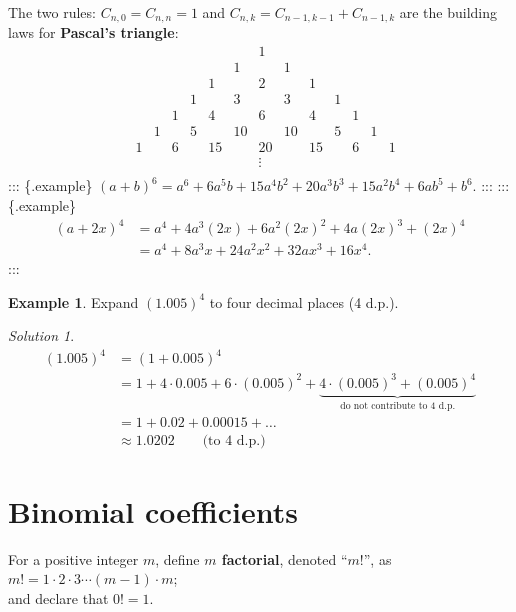 \documentclass[
  english,
  12pt,
  oneside]{book}
\theoremstyle{definition}
\theoremstyle{definition}
\newtheorem{example}{Example}[chapter]
\theoremstyle{definition}
\theoremstyle{definition}
\theoremstyle{remark}
\newtheorem*{solution}{Solution}
\begin{document}
The two rules: \(C_{n,0}=C_{n,n}=1\) and \(C_{n,k}=C_{n-1,k-1}+C_{n-1,k}\) are the building laws for \textbf{Pascal's triangle}:
\[\begin{array}{cccccccccccccc}
    &  &  &  &  &  &  &1 &  &  &  &  &  &   \\
    &  &  &  &  &  &1 &  &1 &  &  &  &  &   \\
    &  &  &  &  &1 &  &2 &  &1 &  &  &  &   \\
    &  &  &  &1 &  &3 &  &3 &  &1 &  &  &   \\
    &  &  &1 &  &4 &  &6 &  &4 &  &1 &  &   \\
    &  &1 &  &5 &  &10&  &10&  &5 &  &1 &   \\
    &1 &  &6 &  &15&  &20&  &15&  &6 &  &1  \\
    &  &  &  &  &  &  &\vdots&  &  &  &  &  &   \\
\end{array}\]
::: \{.example\}
\((a+b)^6 = a^6 + 6 a^5b + 15 a^4b^2 + 20 a^3b^3 + 15 a^2b^4 + 6 ab^5 + b^6\).
:::
::: \{.example\}
\begin{align*}(a+2x)^4 &= a^4 + 4a^3(2x) + 6a^2(2x)^2 + 4a(2x)^3+(2x)^4\\
&= a^4 +8a^3x+24a^2x^2+32ax^3+16x^4.
\end{align*}
:::

\begin{example}
Expand \((1.005)^4\) to four decimal places (4 d.p.).
\end{example}

\begin{solution}
\begin{align*}
(1.005)^4 &= (1+0.005)^4\\
&= 1+ 4\cdot 0.005 + 6\cdot (0.005)^2 + \underbrace{4\cdot(0.005)^3 + (0.005)^4}_{\text{do not contribute to 4 d.p.}}\\
&= 1+0.02 + 0.00015 + \dots \\
&\approx 1.0202\quad\quad\text{(to 4 d.p.)}
\end{align*}
\end{solution}

\section{Binomial coefficients}\label{binomial-coefficients}

For a positive integer \(m\), define \textbf{\(m\) factorial}, denoted ``\(m!\)'', as
\(m!=1\cdot2\cdot 3\cdots (m-1)\cdot m\);\\
and declare that \(0!=1\).
\end{document}
